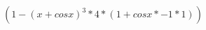 \documentclass{proc}
\begin{document}
$ {( {  1  } - { { { {( {  x  } + {  cos {  x  } } )} ^ {  3  } } * {  4  } } * {( {  1  } + { { {  cos {  x  } } * {  -1  } } * {  1  } } )} } )} $
\end{document}
